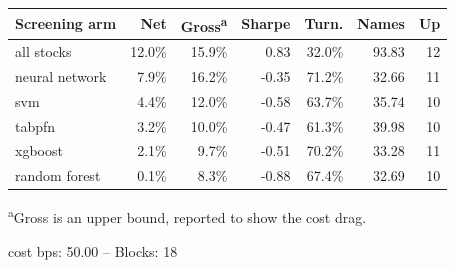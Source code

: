 \begin{threeparttable}
\footnotesize
\setlength{\tabcolsep}{4pt}
\begin{tabularx}{\linewidth}{>{\raggedright\arraybackslash}Xrrrrrr}
\toprule
Screening arm & Net & Gross\textsuperscript{a} & Sharpe & Turn. & Names & Up \\
\midrule
all stocks & 12.0\% & 15.9\% & 0.83 & 32.0\% & 93.83 & 12 \\
neural network & 7.9\% & 16.2\% & -0.35 & 71.2\% & 32.66 & 11 \\
svm & 4.4\% & 12.0\% & -0.58 & 63.7\% & 35.74 & 10 \\
tabpfn & 3.2\% & 10.0\% & -0.47 & 61.3\% & 39.98 & 10 \\
xgboost & 2.1\% & 9.7\% & -0.51 & 70.2\% & 33.28 & 11 \\
random forest & 0.1\% & 8.3\% & -0.88 & 67.4\% & 32.69 & 10 \\
\bottomrule
\end{tabularx}
\begin{tablenotes}[flushleft]\footnotesize
  \item \textsuperscript{a}Gross is an upper bound, reported to show the cost drag.
  \item cost bps: 50.00 -- Blocks: 18
\end{tablenotes}
\end{threeparttable}
